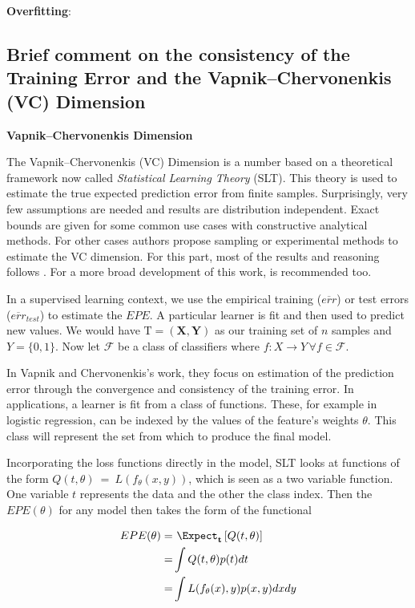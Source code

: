 
\textbf{Overfitting}: 


\subsection{Brief comment on the consistency of the Training Error and the Vapnik–Chervonenkis (VC) Dimension}
\textbf{Vapnik–Chervonenkis Dimension}
\cite{vapnik-nature2013}
\cite{cherkassky-learning2007}

The Vapnik–Chervonenkis (VC) Dimension is a number based on a theoretical framework now called \textit{Statistical Learning Theory} (SLT). This theory is used to estimate the true expected prediction error from finite samples. Surprisingly, very few assumptions are needed and results are distribution independent. Exact bounds are given for some common use cases with constructive analytical methods. For other cases authors propose sampling or experimental methods to estimate the VC dimension. For this part, most of the results and reasoning follows \cite{cherkassky-learning2007}. For a more broad development of this work, \cite{vapnik-nature2013} is recommended too.

In a supervised learning context, we use the empirical training ($\overline{err}$) or test errors ($\overline{err}_{test}$) to estimate the $EPE$. A particular learner is fit and then used to predict new values. We would have $\mathrm{T} = (\textbf{X},\textbf{Y})$ as our training set of $n$ samples   and $Y = \{0,1 \}$. Now let $\mathcal {F}$ be a class of classifiers where $f: X \rightarrow Y \, \forall f \in \mathcal {F}$. 

In Vapnik and Chervonenkis's work, they focus on estimation of the prediction error through the convergence and consistency of the training error. In applications, a learner is fit from a class of functions. These, for example in logistic regression, can be indexed by the values of the feature's weights $\theta$. This class will represent the set from which to produce the final model.

Incorporating the loss functions directly in the model, SLT looks at functions of the form $Q(t,\theta) \ = \ L(f_\theta(x,y))$, which is seen as a two variable function. One variable $t$ represents the data and the other the class index. Then the $EPE(\theta)$ for any model then takes the form of the functional

\begin{equation}\label{vapnik-risk}
\begin{split}
 EPE(\theta) = & \ \Expect_{\textbf{t}} \left[  Q(t,\theta) \right]\\
= & \int Q(t,\theta) p(t) dt  \\
= & \int L(f_\theta(x),y) p(x,y) dx dy 
\end{split}
\end{equation}

